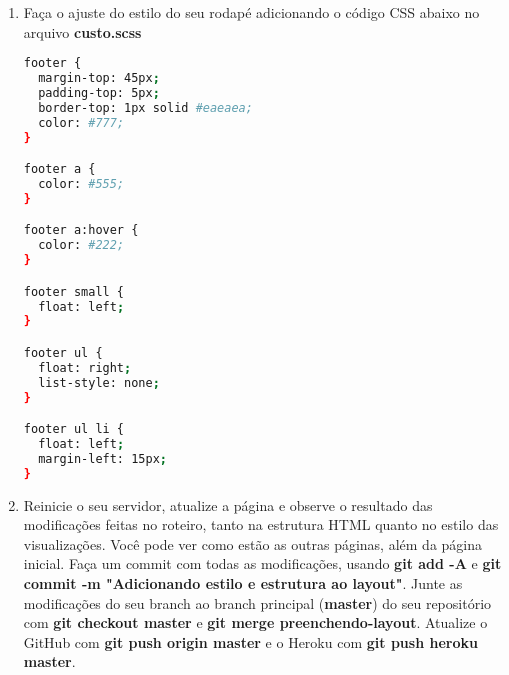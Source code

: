 \documentclass[a4paper,12pt]{article}
\begin{document}
\begin{enumerate}
  \item Faça o ajuste do estilo do seu rodapé adicionando o código CSS abaixo no arquivo \textbf{custo.scss}

  \begin{lstlisting}[language=Bash, title={app/assets/stylesheets/custom.scss}]
footer {
  margin-top: 45px;
  padding-top: 5px;
  border-top: 1px solid #eaeaea;
  color: #777;
}

footer a {
  color: #555;
}

footer a:hover {
  color: #222;
}

footer small {
  float: left;
}

footer ul {
  float: right;
  list-style: none;
}

footer ul li {
  float: left;
  margin-left: 15px;
}
  \end{lstlisting}

  \item Reinicie o seu servidor, atualize a página e observe o resultado das modificações feitas no roteiro, tanto na estrutura HTML quanto no estilo das visualizações. Você pode ver como estão as outras páginas, além da página inicial. Faça um commit com todas as modificações, usando \textbf{git add -A} e \textbf{git commit -m "Adicionando estilo e estrutura ao layout"}. Junte as modificações do seu branch ao branch principal (\textbf{master}) do seu repositório com \textbf{git checkout master} e \textbf{git merge preenchendo-layout}. Atualize o GitHub com \textbf{git push origin master} e o Heroku com \textbf{git push heroku master}.

\end{enumerate}
\end{document}
